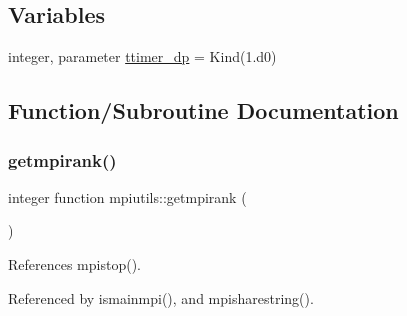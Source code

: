 \subsection*{Variables}
\begin{DoxyCompactItemize}
\item 
integer, parameter \mbox{\hyperlink{namespacempiutils_a29264c4652e8287096a27ca2675edc26}{ttimer\+\_\+dp}} = Kind(1.d0)
\end{DoxyCompactItemize}


\subsection{Function/\+Subroutine Documentation}
\mbox{\label{namespacempiutils_a10119a7c6a3093e9f38566d063e88364}} 
\subsubsection{\texorpdfstring{getmpirank()}{getmpirank()}}
{\footnotesize\ttfamily integer function mpiutils\+::getmpirank (\begin{DoxyParamCaption}{ }\end{DoxyParamCaption})}



References mpistop().



Referenced by ismainmpi(), and mpisharestring().

